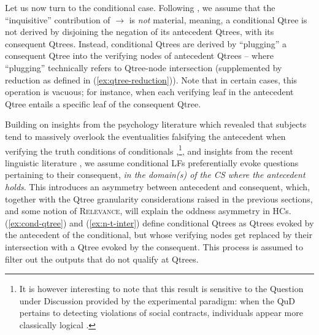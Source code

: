 Let us now turn to the conditional case. Following \citet{HenotMortier2024}, we assume that the ``inquisitive'' contribution of $\rightarrow$ is \textit{not} material, meaning, a conditional Qtree is not derived by disjoining the negation of its antecedent Qtrees, with its consequent Qtrees. Instead, conditional Qtrees are derived by ``plugging'' a consequent Qtree into the verifying nodes of antecedent Qtrees -- where ``plugging'' technically refers to Qtree-node intersection (supplemented by reduction as defined in (\ref{ex:qtree-reduction})). Note that in certain cases, this operation is vacuous; for instance, when each verifying leaf in the antecedent Qtree entails a specific leaf of the consequent Qtree.


Building on insights from the psychology literature which revealed that subjects tend to massively overlook the eventualities falsifying the antecedent when verifying the truth conditions of conditionals \cite{Wason1968},\footnote{It is however interesting to note that this result is sensitive to the Question under Discussion provided by the experimental paradigm: when the QuD pertains to detecting violations of social contracts, individuals appear more classically logical \cite{Cosmides1989}.}, and insights from the recent linguistic literature \citep{Aloni2022}, we assume conditional LFs preferentially evoke questions pertaining to their consequent, \textit{in the domain(s) of the CS where the antecedent holds}. This introduces an asymmetry between antecedent and consequent, which, together with the Qtree granularity considerations raised in the previous sections, and some notion of \textsc{Relevance}, will explain the oddness asymmetry in HCs. (\ref{ex:cond-qtree}) and (\ref{ex:n-t-inter}) define conditional Qtrees as Qtrees evoked by the antecedent of the conditional, but whose verifying nodes get replaced by their intersection with a Qtree evoked by the consequent. This process is assumed to filter out the outputs that do not qualify at Qtrees.

